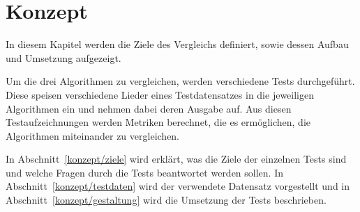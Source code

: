 \chapter{Konzept}
\label{konzept}
\acresetall

In diesem Kapitel werden die Ziele des Vergleichs definiert,
	sowie dessen Aufbau und Umsetzung aufgezeigt.

Um die drei Algorithmen zu vergleichen,
	werden verschiedene Tests durchgeführt.
Diese speisen verschiedene Lieder eines Testdatensatzes in die jeweiligen Algorithmen ein
	und nehmen dabei deren Ausgabe auf.
Aus diesen Testaufzeichnungen werden Metriken berechnet,
	die es ermöglichen,
	die Algorithmen miteinander zu vergleichen.

In Abschnitt~\ref{konzept/ziele} wird erklärt,
	was die Ziele der einzelnen Tests sind
	und welche Fragen durch die Tests beantwortet werden sollen.
In Abschnitt~\ref{konzept/testdaten} wird der verwendete Datensatz vorgestellt
	und in Abschnitt~\ref{konzept/gestaltung} wird die Umsetzung der Tests beschrieben.

